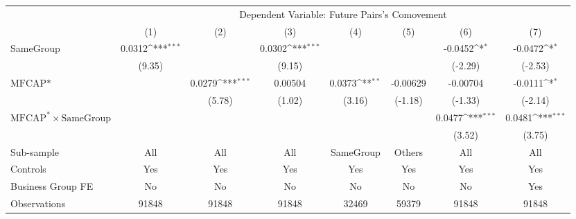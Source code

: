 {
\def\sym#1{\ifmmode^{#1}\else\(^{#1}\)\fi}
\begin{tabular}{l*{7}{c}}
\hline\hline
                &\multicolumn{7}{c}{Dependent Variable:  Future Pairs's Comovement}                                                                  \\\cmidrule(lr){2-8}
                &\multicolumn{1}{c}{(1)}         &\multicolumn{1}{c}{(2)}         &\multicolumn{1}{c}{(3)}         &\multicolumn{1}{c}{(4)}         &\multicolumn{1}{c}{(5)}         &\multicolumn{1}{c}{(6)}         &\multicolumn{1}{c}{(7)}         \\
\hline
SameGroup       &   0.0312\sym{***}&                  &   0.0302\sym{***}&                  &                  &  -0.0452\sym{*}  &  -0.0472\sym{*}  \\
                &   (9.35)         &                  &   (9.15)         &                  &                  &  (-2.29)         &  (-2.53)         \\
[1em]
$ \text{MFCAP*} $&                  &   0.0279\sym{***}&  0.00504         &   0.0373\sym{**} & -0.00629         & -0.00704         &  -0.0111\sym{*}  \\
                &                  &   (5.78)         &   (1.02)         &   (3.16)         &  (-1.18)         &  (-1.33)         &  (-2.14)         \\
[1em]
 $ \text{MFCAP}^* \times {\text{SameGroup} }  $ &                  &                  &                  &                  &                  &   0.0477\sym{***}&   0.0481\sym{***}\\
                &                  &                  &                  &                  &                  &   (3.52)         &   (3.75)         \\
\hline
Sub-sample      &      All         &      All         &      All         &SameGroup         &   Others         &      All         &      All         \\
Controls        &      Yes         &      Yes         &      Yes         &      Yes         &      Yes         &      Yes         &      Yes         \\
Business Group FE&       No         &       No         &       No         &       No         &       No         &       No         &      Yes         \\
Observations    &    91848         &    91848         &    91848         &    32469         &    59379         &    91848         &    91848         \\
\hline\hline  \end{tabular}}
